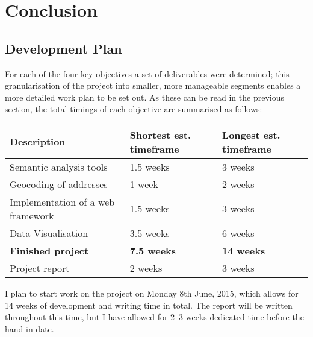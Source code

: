 \documentclass[PROP_AGutteridge_CS.tex]{subfiles}
\begin{document}
\chapter{Conclusion}
\section{Development Plan}
For each of the four key objectives a set of deliverables were determined; this granularisation of the project into smaller, more manageable segments enables a more detailed work plan to be set out. As these can be read in the previous section, the total timings of each objective are summarised as follows:

\begin{table}[h]
\noindent
\centering
\begin{tabular}{ | l | p{2.5cm} | p{2.5cm} | }
	\hline
	\bf{Description} 				& \bf{Shortest est. timeframe} & \bf{Longest est. timeframe}\\ \hline
	Semantic analysis tools 			& 1.5 weeks 		& 3 weeks\\ 
	Geocoding of addresses 			& 1 week 			& 2 weeks\\ 
	Implementation of a web framework 	& 1.5 weeks 		& 3 weeks\\ 
	Data Visualisation 				& 3.5 weeks 		& 6 weeks\\ \hline
	\bf{Finished project} 				& \bf{7.5 weeks} 	& \bf{14 weeks}\\ \hline
	Project report 					& 2 weeks 		& 3 weeks\\ \hline
\end{tabular}
\noindent
\end{table}

I plan to start work on the project on Monday 8th June, 2015, which allows for 14 weeks of development and writing time in total. The report will be written throughout this time, but I have allowed for 2--3 weeks dedicated time before the hand-in date. 
\end{document}
